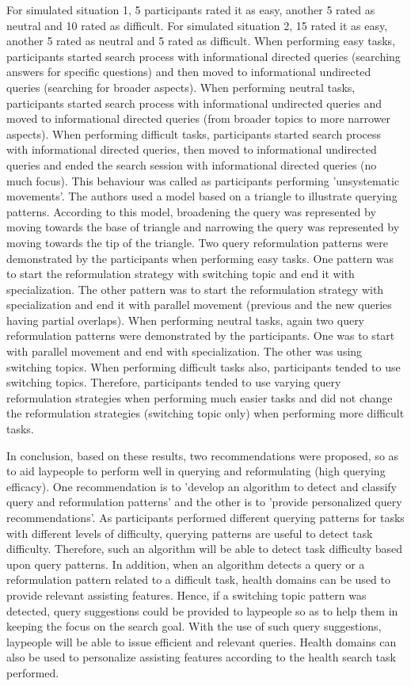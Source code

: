 \documentclass[]{article}
\begin{document}
For simulated situation 1, 5 participants rated it as easy, another 5 rated as neutral and 10 rated as difficult. For simulated situation 2, 15 rated it as easy, another 5 rated as neutral and 5 rated as difficult. When performing easy tasks, participants started search process with informational directed queries (searching answers for specific questions) and then moved to informational undirected queries (searching for broader aspects). When performing neutral tasks, participants started search process with informational undirected queries and moved to informational directed queries (from broader topics to more narrower aspects). When performing difficult tasks, participants started search process with informational directed queries, then moved to informational undirected queries and ended the search session with informational directed queries (no much focus). This behaviour was called as participants performing 'unsystematic movements'. The authors used a model based on a triangle to illustrate querying patterns. According to this model, broadening the query was represented by moving towards the base of triangle and narrowing the query was represented by moving towards the tip of the triangle. Two query reformulation patterns were demonstrated by the participants when performing easy tasks. One pattern was to start the reformulation strategy with switching topic and end it with specialization. The other pattern was to start the reformulation strategy with specialization and end it with parallel movement (previous and the new queries having partial overlaps). When performing neutral tasks, again two query reformulation patterns were demonstrated by the participants. One was to start with parallel movement and end with specialization. The other was using switching topics. When performing difficult tasks also, participants tended to use switching topics. Therefore, participants tended to use varying query reformulation strategies when performing much easier tasks and did not change the reformulation strategies (switching topic only) when performing more difficult tasks. 

In conclusion, based on these results, two recommendations were proposed, so as to aid laypeople to perform well in querying and reformulating (high querying efficacy). One recommendation is to 'develop an algorithm to detect and classify query and reformulation patterns' and the other is to 'provide personalized query recommendations'. As participants performed different querying patterns for tasks with different levels of difficulty, querying patterns are useful to detect task difficulty. Therefore, such an algorithm will be able to detect task difficulty based upon query patterns. In addition, when an algorithm detects a query or a reformulation pattern related to a difficult task, health domains can be used to provide relevant assisting features. Hence, if a switching topic pattern was detected, query suggestions could be provided to laypeople so as to help them in keeping the focus on the search goal. With the use of such query suggestions, laypeople will be able to issue efficient and relevant queries. Health domains can also be used to personalize assisting features according to the health search task performed.      
\end{document}

